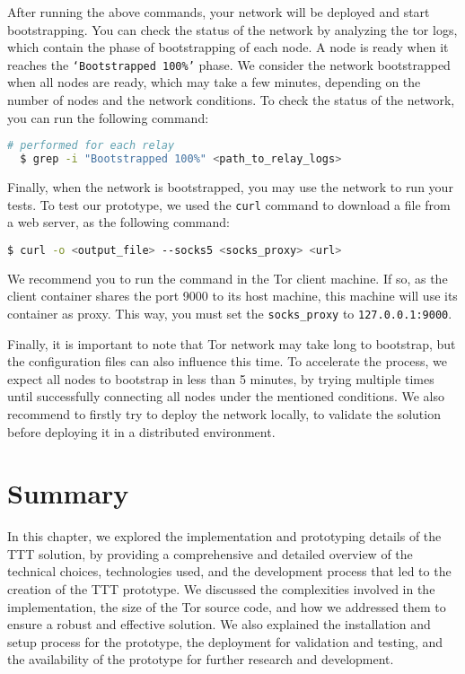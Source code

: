 After running the above commands, your network will be deployed and start bootstrapping. You can check the status of the network by analyzing the tor logs, which contain the phase of bootstrapping of each node. A node is ready when it reaches the \texttt{`Bootstrapped 100\%'} phase. We consider the network bootstrapped when all nodes are ready, which may take a few minutes, depending on the number of nodes and the network conditions. To check the status of the network, you can run the following command:
\begin{lstlisting}[language=bash]
  # performed for each relay
  $ grep -i "Bootstrapped 100%" <path_to_relay_logs> 
\end{lstlisting}

Finally, when the network is bootstrapped, you may use the network to run your tests. To test our prototype, we used the \texttt{curl} command to download a file from a web server, as the following command:
\begin{lstlisting}[language=bash]
  $ curl -o <output_file> --socks5 <socks_proxy> <url>
\end{lstlisting}

We recommend you to run the command in the Tor client machine. If so, as the client container shares the port 9000 to its host machine, this machine will use its container as proxy. This way, you must set the \texttt{socks\_proxy} to \texttt{127.0.0.1:9000}.

Finally, it is important to note that Tor network may take long to bootstrap, but the configuration files can also influence this time. To accelerate the process, we expect all nodes to bootstrap in less than 5 minutes, by trying multiple times until successfully connecting all nodes under the mentioned conditions. We also recommend to firstly try to deploy the network locally, to validate the solution before deploying it in a distributed environment. 

\section{Summary}\label{sec:implementation_summary}
In this chapter, we explored the implementation and prototyping details of the TTT solution, by providing a comprehensive and detailed overview of the technical choices, technologies used, and the development process that led to the creation of the TTT prototype. We discussed the complexities involved in the implementation, the size of the Tor source code, and how we addressed them to ensure a robust and effective solution. We also explained the installation and setup process for the prototype, the deployment for validation and testing, and the availability of the prototype for further research and development.
